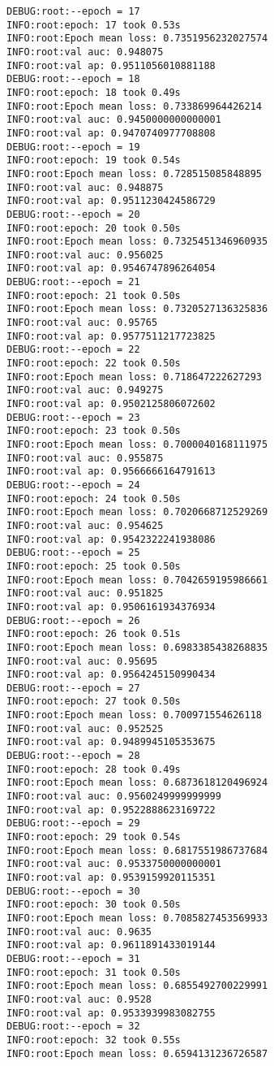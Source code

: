 \documentclass[11pt]{article}
\begin{document}
\begin{verbatim}
DEBUG:root:--epoch = 17
INFO:root:epoch: 17 took 0.53s
INFO:root:Epoch mean loss: 0.7351956232027574
INFO:root:val auc: 0.948075
INFO:root:val ap: 0.9511056010881188
DEBUG:root:--epoch = 18
INFO:root:epoch: 18 took 0.49s
INFO:root:Epoch mean loss: 0.733869964426214
INFO:root:val auc: 0.9450000000000001
INFO:root:val ap: 0.9470740977708808
DEBUG:root:--epoch = 19
INFO:root:epoch: 19 took 0.54s
INFO:root:Epoch mean loss: 0.728515085848895
INFO:root:val auc: 0.948875
INFO:root:val ap: 0.9511230424586729
DEBUG:root:--epoch = 20
INFO:root:epoch: 20 took 0.50s
INFO:root:Epoch mean loss: 0.7325451346960935
INFO:root:val auc: 0.956025
INFO:root:val ap: 0.9546747896264054
DEBUG:root:--epoch = 21
INFO:root:epoch: 21 took 0.50s
INFO:root:Epoch mean loss: 0.7320527136325836
INFO:root:val auc: 0.95765
INFO:root:val ap: 0.9577511217723825
DEBUG:root:--epoch = 22
INFO:root:epoch: 22 took 0.50s
INFO:root:Epoch mean loss: 0.718647222627293
INFO:root:val auc: 0.949275
INFO:root:val ap: 0.9502125806072602
DEBUG:root:--epoch = 23
INFO:root:epoch: 23 took 0.50s
INFO:root:Epoch mean loss: 0.7000040168111975
INFO:root:val auc: 0.955875
INFO:root:val ap: 0.9566666164791613
DEBUG:root:--epoch = 24
INFO:root:epoch: 24 took 0.50s
INFO:root:Epoch mean loss: 0.7020668712529269
INFO:root:val auc: 0.954625
INFO:root:val ap: 0.9542322241938086
DEBUG:root:--epoch = 25
INFO:root:epoch: 25 took 0.50s
INFO:root:Epoch mean loss: 0.7042659195986661
INFO:root:val auc: 0.951825
INFO:root:val ap: 0.9506161934376934
DEBUG:root:--epoch = 26
INFO:root:epoch: 26 took 0.51s
INFO:root:Epoch mean loss: 0.6983385438268835
INFO:root:val auc: 0.95695
INFO:root:val ap: 0.9564245150990434
DEBUG:root:--epoch = 27
INFO:root:epoch: 27 took 0.50s
INFO:root:Epoch mean loss: 0.700971554626118
INFO:root:val auc: 0.952525
INFO:root:val ap: 0.9489945105353675
DEBUG:root:--epoch = 28
INFO:root:epoch: 28 took 0.49s
INFO:root:Epoch mean loss: 0.6873618120496924
INFO:root:val auc: 0.9560249999999999
INFO:root:val ap: 0.9522888623169722
DEBUG:root:--epoch = 29
INFO:root:epoch: 29 took 0.54s
INFO:root:Epoch mean loss: 0.6817551986737684
INFO:root:val auc: 0.9533750000000001
INFO:root:val ap: 0.9539159920115351
DEBUG:root:--epoch = 30
INFO:root:epoch: 30 took 0.50s
INFO:root:Epoch mean loss: 0.7085827453569933
INFO:root:val auc: 0.9635
INFO:root:val ap: 0.9611891433019144
DEBUG:root:--epoch = 31
INFO:root:epoch: 31 took 0.50s
INFO:root:Epoch mean loss: 0.6855492700229991
INFO:root:val auc: 0.9528
INFO:root:val ap: 0.9533939983082755
DEBUG:root:--epoch = 32
INFO:root:epoch: 32 took 0.55s
INFO:root:Epoch mean loss: 0.6594131236726587

\end{verbatim}
\end{document}

